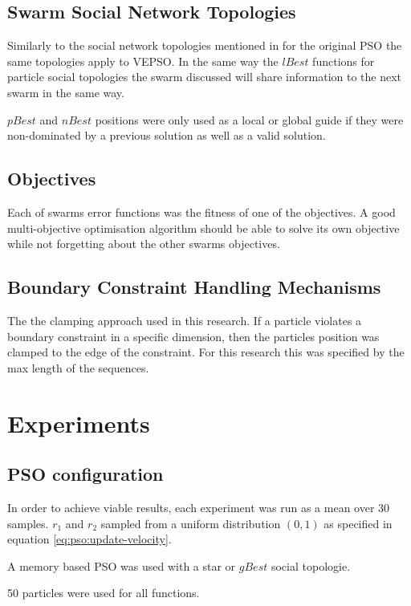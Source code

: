 \documentclass[conference]{IEEEtran}
\begin{document}
\subsection{Swarm Social Network Topologies}

Similarly to the social network topologies mentioned in for the original \ac{PSO} the same topologies apply to \ac{VEPSO}. In the same way the $lBest$ functions for particle social topologies the swarm discussed will share information to the next swarm in the same way.

$pBest$ and $nBest$ positions were only used as a local or global guide if they were non-dominated by a previous solution as well as a valid solution.

\subsection{Objectives}

Each of swarms error functions was the fitness of one of the objectives. A good multi-objective optimisation algorithm should be able to solve its own objective while not forgetting about the other swarms objectives.

\subsection{Boundary Constraint Handling Mechanisms}

The the clamping approach used in this research. If a particle violates a boundary constraint in a specific dimension, then the particles position was clamped to the edge of the constraint. For this research this was specified by the max length of the sequences.

\section{Experiments}
    \subsection{\ac{PSO} configuration}
    In order to achieve viable results, each experiment was run as a mean over 30 samples. $r_1$ and $r_2$ sampled from a uniform distribution $ (0, 1) $ as specified in equation \ref{eq:pso:update-velocity}.
    
    A memory based \ac{PSO} was used with a star or $ gBest $ social topologie. 
    
    50 particles were used for all functions. 
    
\end{document}
